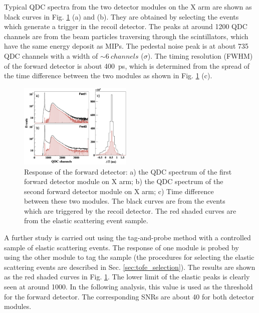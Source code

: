 \documentclass[number,5p]{elsarticle}
\begin{document}
Typical QDC spectra from the two detector modules on the X arm are shown as
black curves in Fig. \ref{fig:fwd_performance} (a) and (b).
They are obtained by selecting the events which generate a trigger in the recoil detector.
The peaks at around \num{1200} QDC channels are from the beam particles traversing through the scintillators, which have the same energy deposit as MIPs.
The pedestal noise peak is at about \num{735} QDC channels with a width of
$\sim\SI{6}{channels}$ ($\sigma$).
The timing resolution (FWHM) of the forward detector is about \SI{400}{ps}, which is determined from the spread of the time difference between the two modules as shown in Fig. \ref{fig:fwd_performance} (c).
\begin{figure}[b!]
  \centering
  \includegraphics[width=0.48\textwidth]{./fwd_performance_elastic.png}
  \caption{Response of the forward detector: a) the QDC spectrum of the first forward detector module on X arm;
    b) the QDC spectrum of the second forward detector module on X arm; c) Time difference between these two modules.
    The black curves are from the events which are triggered by the recoil
    detector.
    The red shaded curves are from the elastic scattering event sample.
  }
  \label{fig:fwd_performance}
\end{figure}

A further study is carried out using the tag-and-probe method with a controlled
sample of elastic scattering events.
The response of one module is probed by using the other module to tag the sample
(the procedures for selecting the elastic scattering events are described in Sec. \ref{sec:tofe_selection}).
The results are shown as the red shaded curves in Fig. \ref{fig:fwd_performance}.
The lower limit of the elastic peaks is clearly seen at around \num{1000}.
In the following analysis, this value is used as the threshold for the forward detector.
The corresponding SNRs are about \num{40} for both detector modules.
\end{document}
